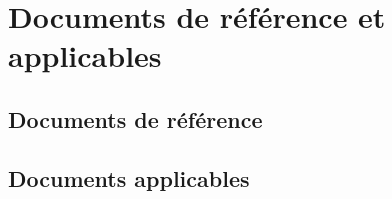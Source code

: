 
\section{Documents de référence et applicables}
    
    \subsection{Documents de référence}

    \subsection{Documents applicables}
\pagebreak
